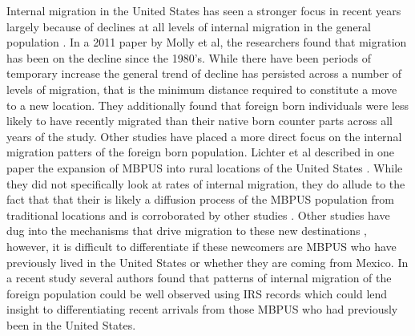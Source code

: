 \documentclass[fleqn,12pt]{olplainarticle}
\begin{document}
Internal migration in the United States has seen a stronger focus in recent years largely because of declines at all levels of internal migration in the general population  \citep{Molloy2011a}.
In a 2011 paper by Molly et al, the researchers found that migration has been on the decline since the 1980's.
While there have been periods of temporary increase the general trend of decline has persisted across a number of levels of migration, that is the minimum distance required to constitute a move to a new location.
They additionally found that foreign born individuals were less likely to have recently migrated than their native born counter parts across all years of the study.
Other studies have placed a more direct focus on the internal migration patters of the foreign born population.
Lichter et al described in one paper the expansion of MBPUS into rural locations of the United States  \citep{Lichter2012a}.
While they did not specifically look at rates of internal migration, they do allude to the fact that that their is likely a diffusion process of the MBPUS population from traditional locations and is corroborated by other studies  \citep{Lichter2009, Frey2011}.
Other studies have dug into the mechanisms that drive migration to these new destinations  \citep{ Kandel2005,  Ellis2016,  Hernandez-Leon2000}, however, it is difficult to differentiate if these newcomers are MBPUS who have previously lived in the United States or whether they are coming from Mexico.
In a recent study several authors found that patterns of internal migration of the foreign population could be well observed using IRS records  \citep{Foster2018} which could lend insight to differentiating recent arrivals from those MBPUS who had previously been in the United States. 
\end{document}
